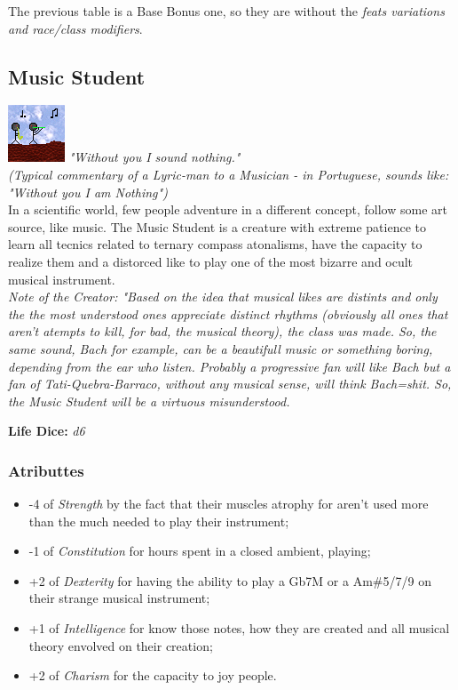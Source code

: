 \documentclass[ letterpaper,12pt]{article}
\begin{document}
The previous table is a Base Bonus one, so they are without the {\it feats variations and race/class modifiers}.\\

\subsection{Music Student}
\includegraphics{../data/classes/Img/musica.png}
{\it "Without you I sound nothing."\\
     (Typical commentary of a Lyric-man to a Musician - in Portuguese, sounds like: "Without you I am Nothing")}\\

In  a  scientific   world,   few   people adventure in a different  concept, follow some art source, like  music.  The  Music Student  is  a  creature   with   extreme patience to learn all tecnics related  to ternary  compass  atonalisms,  have   the capacity to realize them and  a distorced like to play one of the most bizarre  and ocult musical instrument. \\

{\it Note of the Creator: "Based  on  the idea that musical likes are distints  and only the the most understood  ones  appreciate distinct rhythms (obviously all ones that aren't  atempts  to   kill,  for bad, the musical theory), the class was made.  So, the same sound, Bach for example, can  be a beautifull music or  something  boring, depending  from  the  ear   who   listen. Probably a progressive fan will like Bach but a fan of Tati-Quebra-Barraco, without any musical sense, will think  Bach=shit. So, the Music Student will be a  virtuous misunderstood.}

{\bf Life Dice: }{\it d6}\\ 

\subsubsection{Atributtes}
\begin{itemize}
\item{-4 of {\it Strength} by  the fact  that their muscles atrophy for aren't used more than the much needed to play their instrument;}
\item{-1 of {\it Constitution} for hours  spent  in a closed ambient, playing;}
\item{+2 of {\it Dexterity} for having the ability to play  a  Gb7M  or  a  Am\#5/7/9  on  their strange musical instrument;}
\item{+1 of {\it Intelligence} for  know those notes, how  they  are  created  and  all musical theory envolved on their creation;}
\item{+2 of {\it Charism} for  the  capacity  to joy people.}
\end{itemize}
\end{document}

